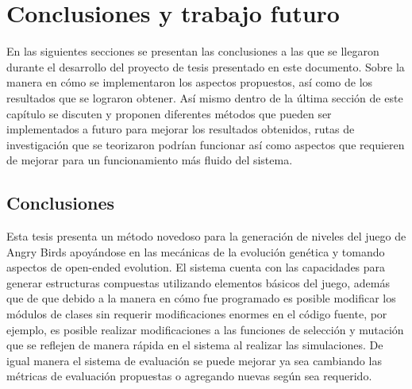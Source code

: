 \chapter{Conclusiones y trabajo futuro}
\label{chapter:conclusions-and-future-work}

En las siguientes secciones se presentan las conclusiones a las que se llegaron
durante el desarrollo del proyecto de tesis presentado en este documento. 
Sobre la manera en cómo se implementaron los aspectos propuestos, así como de los
resultados que se lograron obtener. Así mismo dentro de la última sección de
este capítulo se discuten y proponen
diferentes métodos que pueden ser implementados a futuro para mejorar los
resultados obtenidos, rutas de investigación que se teorizaron podrían funcionar
así como aspectos que requieren de mejorar para un funcionamiento más fluido del
sistema.

\section{Conclusiones}
\label{section:conclusions}

Esta tesis presenta un método novedoso para la generación de niveles del juego de
Angry Birds apoyándose en las mecánicas de la evolución genética y tomando
aspectos de open-ended evolution. El sistema cuenta con las
capacidades para generar estructuras compuestas utilizando elementos básicos del
juego, además que de que debido a la manera en cómo fue programado es posible
modificar los módulos de clases sin requerir modificaciones enormes en el código
fuente, por ejemplo, es posible realizar modificaciones a las funciones de
selección y mutación que se reflejen de manera rápida en el sistema al realizar
las simulaciones. De igual manera el sistema de evaluación se puede mejorar ya
sea cambiando las métricas de evaluación propuestas o agregando nuevas según sea
requerido.

